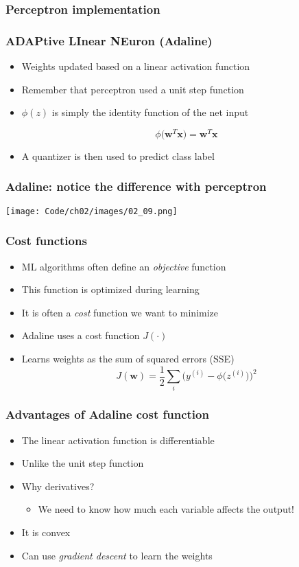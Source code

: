 \documentclass{beamer}
\begin{document}
\begin{frame}
  \frametitle{Perceptron implementation}
  \href{https://github.com/rasbt/python-machine-learning-book/blob/master/code/ch02/ch02.ipynb}{}
\end{frame}

\begin{frame}
  \frametitle{ADAPtive LInear NEuron (Adaline)}
  \begin{itemize}
  \item Weights updated based on a linear activation function
  \item Remember that perceptron used a unit step function
  \item  $\phi(z)$ is simply the identity function of the net input

    \[
    \phi \big( \mathbf{w}^T \mathbf{x} \big) = \mathbf{w}^T \mathbf{x}
    \]

    \item A quantizer is then used to predict class label
  \end{itemize}
\end{frame}

\begin{frame}
  \frametitle{Adaline: notice the difference with perceptron}
  \texttt{[image: Code/ch02/images/02\_09.png]}
\end{frame}

\begin{frame}
  \frametitle{Cost functions}
  \begin{itemize}
  \item ML algorithms often define an \emph{objective} function
  \item This function is optimized during learning
  \item It is often a \emph{cost} function we want to minimize
  \item Adaline uses a cost function $J(\cdot)$
  \item Learns weights as the sum of squared errors (SSE)
    \[
    J(\mathbf{w}) = \frac{1}{2} \sum_i \bigg(y^{(i)}  - \phi \big(z^{(i)} \big) \bigg)^2
    \]
  \end{itemize}
\end{frame}

\begin{frame}
  \frametitle{Advantages of Adaline cost function}
  \begin{itemize}
  \item The linear activation function is differentiable
  \item Unlike the unit step function
  \item Why derivatives?
    \begin{itemize}
    \item We need to know how much each variable affects the output!
    \end{itemize}
  \item It is convex
  \item Can use \emph{gradient descent} to learn the weights
  \end{itemize}
\end{frame}
\end{document}
